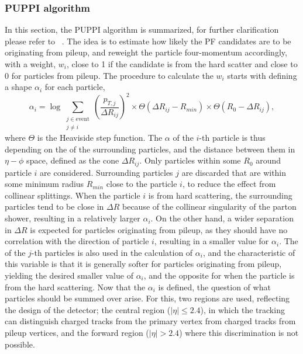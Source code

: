 \subsubsection*{PUPPI algorithm}
\noindent
\justify
In this section, the PUPPI algorithm is summarized, for further clarification please refer to ~\cite{Bertolini:2014bba}. 
The idea is to estimate how likely the PF candidates are to be originating from pileup, and reweight the particle four-momentum accordingly, with a weight, $w_{i}$, close to 1 if the candidate is from the hard scatter and close to 0 for particles from pileup. 
The procedure to calculate the $w_{i}$ starts with defining a shape $\alpha_{i}$ for each particle, 
\begin{equation}
  \alpha_i = \log \sum_{\substack{j \in \text{event} \\ j \neq i}} \left(\frac{p_{T, j}}{\Delta R_{ij}}\right)^{2} \times \Theta(\Delta R_{ij}-R_{min})\times \Theta(R_{0}-\Delta R_{ij}),
\end{equation}
where $\Theta$ is the Heaviside step function. 
The $\alpha$ of the $i$-th particle is thus depending on the \pt of the surrounding particles, and the distance between them in $\eta-\phi$ space, defined as the cone $\Delta R_{ij}$.
Only particles within some $R_{0}$ around particle $i$ are considered. 
Surrounding particles $j$ are discarded that are within some minimum radius $R_{min}$ close to the particle $i$, to reduce the effect from collinear splittings. 
When the particle $i$ is from hard scattering, the surrounding particles tend to be close in $\Delta R$ because of the collinear singularity of the parton shower, resulting in a relatively larger $\alpha_{i}$. 
On the other hand, a wider separation in $\Delta R$ is expected for particles originating from pileup, as they should have no correlation with the direction of particle $i$, resulting in a smaller value for $\alpha_{i}$. 
The \pt of the $j$-th particles is also used in the calculation of $\alpha_{i}$, and the characteristic of this variable is that it is generally softer for particles originating from pileup, yielding the desired smaller value of $\alpha_{i}$, and the opposite for when the particle is from the hard scattering. 
Now that the $\alpha_{i}$ is defined, the question of what particles should be summed over arise. 
For this, two regions are used, reflecting the design of the detector; the central region ($|\eta|\leq2.4$), in which the tracking can distinguish charged tracks from the primary vertex from charged tracks from pileup vertices, and the forward region ($|\eta|>2.4$) where this discrimination is not possible.

